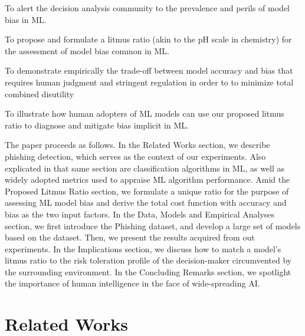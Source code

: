 \documentclass[deca,nonblindrev]{informs3} %
\begin{document}
\begin{henumerate}
\item To alert the decision analysis  community to the prevalence and perils of model bias in ML.

\item To propose and formulate a litmus ratio (akin to the pH scale in chemistry) for the assessment of model bias common in ML.
\item To demonstrate empirically the trade-off between model accuracy and bias that  requires human judgment and stringent regulation in order to to minimize total combined  disutility
\item To illustrate  how human adopters of ML models can use our proposed litmus ratio to diagnose and mitigate bias implicit in ML.
 
\end{henumerate}

The paper proceeds as follows. In the Related Works section, we describe phishing detection, which serves as the context of our experiments. Also explicated in that same section are classification algorithms in ML, as well as widely adopted metrics used to appraise ML algorithm performance. Amid the Proposed Litmus Ratio section, we formulate a unique ratio for the purpose of assessing ML model bias and derive the total cost function with accuracy and bias as the two input factors. In the Data, Models  and Empirical Analyses section, we first introduce the Phishing dataset, and develop a large set of models based on the dataset.  Then, we present the results acquired from out experiments. In the Implications section, we discuss how to match a model's litmus ratio to the risk toleration profile of the decision-maker circumvented by the surrounding environment. In the Concluding Remarks section, we spotlight the importance of human intelligence in the face of wide-spreading AI. 


\section{Related Works }
\end{document}
